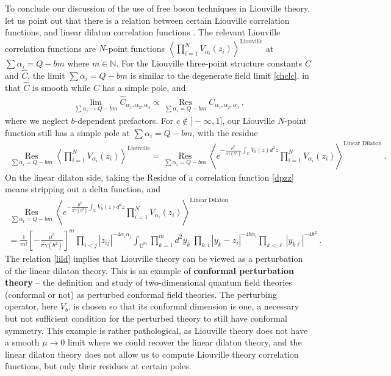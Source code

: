 \documentclass[12pt, a4paper, notitlepage, twoside]{report}
\numberwithin{equation}{section}
\theoremstyle{break}
\begin{document}
To conclude our discussion of the use of free boson techniques in Liouville theory, let us point out 
that there is a relation between certain Liouville correlation functions, and linear dilaton correlation functions \cite{zz95}.
The relevant Liouville correlation functions are $N$-point functions $\left\langle \prod_{i=1}^N V_{\alpha_i}(z_i)\right\rangle^{\text{Liouville}}$ at $\sum\alpha_i = Q-bm$ where $m\in \mathbb{N}$.  
For the Liouville three-point structure constants $C$ and $\hat C$, the limit $\sum\alpha_i = Q-bm$ is similar to the degenerate field limit \eqref{chclc}, in that $\hat C$ is smooth while $C$ has a simple pole, and
\begin{align}
 \lim_{\sum\alpha_i \to Q-bm} \hat C_{\alpha_1,\alpha_2,\alpha_3} 
 \propto \underset{\sum \alpha_i = Q-bm}{\operatorname{Res}}  C_{\alpha_1,\alpha_2,\alpha_3}\ ,
\end{align}
where we neglect $b$-dependent prefactors. 
For $c\notin ]-\infty,1]$, our Liouville $N$-point function still has a simple pole at $\sum\alpha_i = Q-bm$, with the residue
\begin{align}
 \underset{\sum \alpha_i = Q-bm}{\operatorname{Res}} \left\langle \prod_{i=1}^N V_{\alpha_i}(z_i)\right\rangle^{\text{Liouville}} = \underset{\sum\alpha_i = Q-bm}{\operatorname{Res}} \left\langle e^{-\frac{\mu^b}{\pi\gamma(b^2)}\int_{\mathbb{C}} V_b(z)d^2z}\prod_{i=1}^N V_{\alpha_i}(z_i)\right\rangle^{\text{Linear\ Dilaton}}\ .
\label{lild}
\end{align}
On the linear dilaton side, taking the Residue of a correlation function \eqref{dpzz} means stripping out a delta function, and 
\begin{multline}
 \underset{\sum\alpha_i = Q-bm}{\operatorname{Res}} \left\langle e^{-\frac{\mu^b}{\pi\gamma(b^2)}\int_{\mathbb{C}} V_b(z)d^2z}\prod_{i=1}^N V_{\alpha_i}(z_i)\right\rangle^{\text{Linear\ Dilaton}}
\\
= \frac{1}{m!}\left[-\frac{\mu^b}{\pi\gamma(b^2)}\right]^m \prod_{i<j} |z_{ij}|^{-4\alpha_i\alpha_j} \int_{{\mathbb{C}}^m} \prod_{k=1}^m d^2y_k\ \prod_{k,i} |y_k-z_i|^{-4b\alpha_i}\prod_{k<\ell} |y_{k\ell}|^{-4b^2}\ .
\label{mint}
\end{multline}
The relation \eqref{lild} implies that Liouville theory can be viewed as a perturbation of the linear dilaton theory.
This is an example of \textbf{\boldmath conformal perturbation theory} -- the definition and study of two-dimensional quantum field theories (conformal or not) as perturbed conformal field theories.
The perturbing operator, here $V_b$, is chosen so that its conformal dimension is one, a necessary but not sufficient condition for the perturbed theory to still have conformal symmetry.
This example is rather pathological, as Liouville theory does not have a smooth $\mu\to 0$ limit where we could recover the linear dilaton theory, and the linear dilaton theory does not allow us to compute Liouville theory correlation functions, but only their residues at certain poles. 
\end{document}
